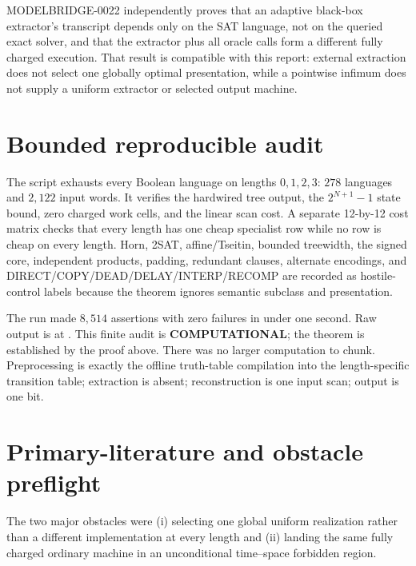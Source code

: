 \documentclass[11pt]{article}
\newcommand{\COMP}{\textbf{COMPUTATIONAL}}
\begin{document}
MODELBRIDGE-0022 independently proves that an adaptive black-box extractor's
transcript depends only on the SAT language, not on the queried exact solver,
and that the extractor plus all oracle calls form a different fully charged
execution.  That result is compatible with this report: external extraction
does not select one globally optimal presentation, while a pointwise
infimum does not supply a uniform extractor or selected output machine.

\section{Bounded reproducible audit}

The script
 exhausts
every Boolean language on lengths \(0,1,2,3\): \(278\) languages and \(2,122\)
input words.  It verifies the hardwired tree output, the \(2^{N+1}-1\) state
bound, zero charged work cells, and the linear scan cost.  A separate
12-by-12 cost matrix checks that every length has one cheap specialist row
while no row is cheap on every length.  Horn, 2SAT, affine/Tseitin, bounded
treewidth, the signed core, independent products, padding, redundant clauses,
alternate encodings, and DIRECT/COPY/DEAD/DELAY/INTERP/RECOMP are recorded as
hostile-control labels because the theorem ignores semantic subclass and
presentation.

The run made \(8{,}514\) assertions with zero failures in under one second.
Raw output is at
.
This finite audit is \COMP; the theorem is established by the proof above.
There was no larger computation to chunk.  Preprocessing is exactly the
offline truth-table compilation into the length-specific transition table;
extraction is absent; reconstruction is one input scan; output is one bit.

\section{Primary-literature and obstacle preflight}

The two major obstacles were (i) selecting one global uniform realization
rather than a different implementation at every length and (ii) landing the
same fully charged ordinary machine in an unconditional time--space forbidden
region.
\end{document}
